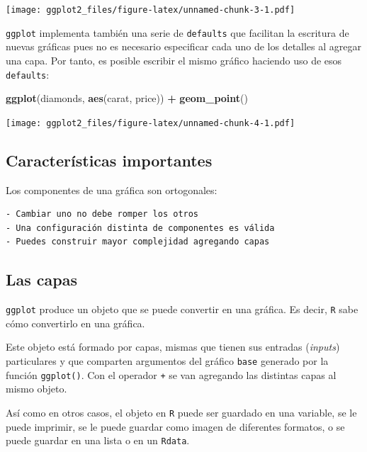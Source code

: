 \documentclass[]{article}
\newenvironment{Shaded}{\begin{snugshade}}{\end{snugshade}}
\newcommand{\KeywordTok}[1]{\textcolor[rgb]{0.13,0.29,0.53}{\textbf{#1}}}
\newcommand{\StringTok}[1]{\textcolor[rgb]{0.31,0.60,0.02}{#1}}
\newcommand{\OperatorTok}[1]{\textcolor[rgb]{0.81,0.36,0.00}{\textbf{#1}}}
\newcommand{\NormalTok}[1]{#1}
\begin{document}
\texttt{[image: ggplot2\_files/figure-latex/unnamed-chunk-3-1.pdf]}

\texttt{ggplot} implementa también una serie de \texttt{defaults}
\parencite[][p. 3]{ggplot2} que facilitan la escritura de nuevas
gráficas pues no es necesario especificar cada uno de los detalles al
agregar una capa. Por tanto, es posible escribir el mismo gráfico
haciendo uso de esos \texttt{defaults}:

\begin{Shaded}
\begin{Highlighting}[]
\KeywordTok{ggplot}\NormalTok{(diamonds, }\KeywordTok{aes}\NormalTok{(carat, price)) }\OperatorTok{+}\StringTok{ }\KeywordTok{geom_point}\NormalTok{()}
\end{Highlighting}
\end{Shaded}

\texttt{[image: ggplot2\_files/figure-latex/unnamed-chunk-4-1.pdf]}

\subsection{Características
importantes}\label{caracteristicas-importantes}

Los componentes de una gráfica son ortogonales:

\begin{verbatim}
- Cambiar uno no debe romper los otros
- Una configuración distinta de componentes es válida
- Puedes construir mayor complejidad agregando capas
\end{verbatim}

\subsection{Las capas}\label{las-capas}

\texttt{ggplot} produce un objeto que se puede convertir en una gráfica.
Es decir, \texttt{R} sabe cómo convertirlo en una gráfica.

Este objeto está formado por capas, mismas que tienen sus entradas
(\emph{inputs}) particulares y que comparten argumentos del gráfico
\texttt{base} generado por la función \texttt{ggplot()}. Con el operador
\texttt{+} se van agregando las distintas capas al mismo objeto.

Así como en otros casos, el objeto en \texttt{R} puede ser guardado en
una variable, se le puede imprimir, se le puede guardar como imagen de
diferentes formatos, o se puede guardar en una lista o en un
\texttt{Rdata}.
\end{document}
